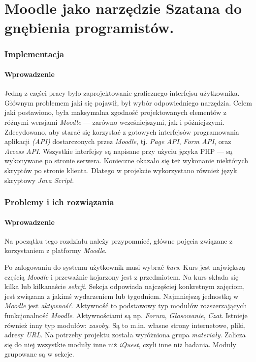 \documentclass[12pt]{article}
\begin{document}
\part{Moodle jako narzędzie Szatana do gnębienia programistów.}
\section{Implementacja}
\subsection{Wprowadzenie}
Jedną z części pracy było zaprojektowanie graficznego interfejsu użytkownika. Głównym problemem jaki się pojawił, był wybór odpowiedniego narzędzia. Celem jaki postawiono, była maksymalna zgodność projektowanych elementów z różnymi wersjami \emph{Moodle} --- zarówno wcześniejszymi, jak i późniejszymi. Zdecydowano, aby starać się korzystać z gotowych interfejsów programowania aplikacji \emph{(API)} dostarczonych przez \emph{Moodle}, tj. \emph{Page API}, \emph{Form API}, oraz \emph{Access API}. Wszystkie interfejsy są napisane przy użyciu języka PHP --- są wykonywane po stronie serwera. Konieczne okazało się też wykonanie niektórych skryptów po stronie klienta. Dlatego w projekcie wykorzystano również język skryptowy \emph{Java Script}.

\section{Problemy i ich rozwiązania}
\subsection{Wprowadzenie}
Na początku tego rozdziału należy przypomnieć, główne pojęcia związane z korzystaniem z platformy \emph{Moodle}.

Po zalogowaniu do systemu użytkownik musi wybrać \emph{kurs}. Kurs jest największą częścią \emph{Moodle} i przeważnie kojarzony jest z przedmiotem. Na kurs składa się kilka lub kilkanaście \emph{sekcji}. Sekcja odpowiada najczęściej konkretnym zajęciom, jest związana z jakimś wydarzeniem lub tygodniem. Najmniejszą jednostką w \emph{Moodle} jest \emph{aktywność}. Aktywność to podstawowy typ modułów rozszerzających funkcjonalność \emph{Moodle}. Aktywnościami są np. \emph{Forum}, \emph{Głosowanie}, \emph{Czat}. Istnieje również inny typ modułów: \emph{zasoby}. Są to m.in. własne strony internetowe, pliki, adresy \emph{URL}. Na potrzeby projektu została wyróżniona grupa \emph{materiały}. Zalicza się do niej wszystkie moduły inne niż \emph{iQuest}, czyli inne niż badania. Moduły grupowane są w sekcje.
\end{document}
